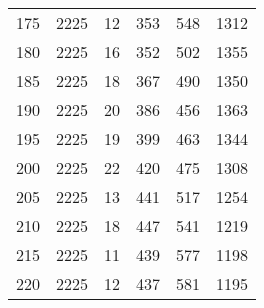 \begin{longtable}{|l|l|l|l|l|l|}
175 & 2225 & 12 & 353 & 548 & 1312 \\
180 & 2225 & 16 & 352 & 502 & 1355 \\
185 & 2225 & 18 & 367 & 490 & 1350 \\
190 & 2225 & 20 & 386 & 456 & 1363 \\
195 & 2225 & 19 & 399 & 463 & 1344 \\
200 & 2225 & 22 & 420 & 475 & 1308 \\
205 & 2225 & 13 & 441 & 517 & 1254 \\
210 & 2225 & 18 & 447 & 541 & 1219 \\
215 & 2225 & 11 & 439 & 577 & 1198 \\
220 & 2225 & 12 & 437 & 581 & 1195 \\

	\bottomrule
\end{longtable}